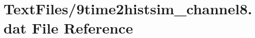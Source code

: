 \hypertarget{9time2histsim__channel8_8dat}{}\section{Text\+Files/9time2histsim\+\_\+channel8.dat File Reference}
\label{9time2histsim__channel8_8dat}
